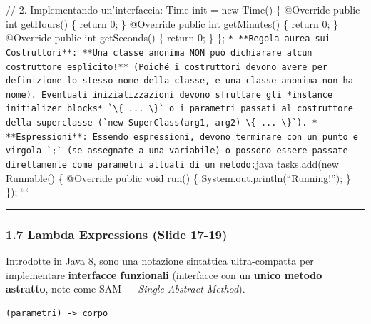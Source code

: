 \documentclass[11pt,a4paper]{article}
\newcommand{\passthrough}[1]{#1}
\begin{document}
// 2. Implementando un'interfaccia: Time init = new Time() \{ @Override
public int getHours() \{ return 0; \} @Override public int getMinutes()
\{ return 0; \} @Override public int getSeconds() \{ return 0; \} \};
\passthrough{\lstinline"* **Regola aurea sui Costruttori**: **Una classe anonima NON può dichiarare alcun costruttore esplicito!** (Poiché i costruttori devono avere per definizione lo stesso nome della classe, e una classe anonima non ha nome). Eventuali inizializzazioni devono sfruttare gli *instance initializer blocks* `\{ ... \}` o i parametri passati al costruttore della superclasse (`new SuperClass(arg1, arg2) \{ ... \}`). * **Espressioni**: Essendo espressioni, devono terminare con un punto e virgola `;` (se assegnate a una variabile) o possono essere passate direttamente come parametri attuali di un metodo:"}java
tasks.add(new Runnable() \{ @Override public void run() \{
System.out.println(``Running!''); \} \}); ```

\begin{center}\rule{0.5\linewidth}{0.5pt}\end{center}

\subsubsection{1.7 Lambda Expressions (Slide
17-19)}\label{lambda-expressions-slide-17-19}

Introdotte in Java 8, sono una notazione sintattica ultra-compatta per
implementare \textbf{interfacce funzionali} (interfacce con un
\textbf{unico metodo astratto}, note come SAM --- \emph{Single Abstract
Method}).

\begin{lstlisting}
(parametri) -> corpo
\end{lstlisting}
\end{document}

